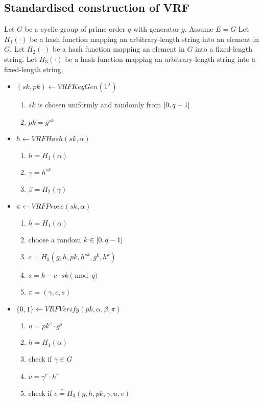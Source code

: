 \subsection{Standardised construction of VRF}

Let $G$ be a cyclic group of prime order $q$ with generator $g$. Assume $E = G$
Let $H_1(\cdot)$ be a hash function mapping an arbitrary-length string into an element in $G$.
Let $H_2(\cdot)$ be a hash function mapping an element in $G$ into a fixed-length string.
Let $H_3(\cdot)$ be a hash function mapping an arbitrary-length string into a fixed-length string.

\begin{itemize}
    \item $(sk, pk) \leftarrow VRFKeyGen(1^{\lambda})$
        \begin{enumerate}
            \item $sk$ is chosen uniformly and randomly from $\interval{0}{q-1}$
            \item $pk = g^{sk}$
        \end{enumerate}
    \item $h \leftarrow VRFHash(sk, \alpha)$
        \begin{enumerate}
            \item $h = H_{1}(\alpha)$
            \item $\gamma = h^{sk}$
            \item $\beta = H_{2}(\gamma)$
        \end{enumerate}
    \item $\pi \leftarrow VRFProve(sk, \alpha)$
        \begin{enumerate}
            \item $h = H_{1}(\alpha)$
            \item choose a random $k \in \interval{0}{q-1}$
            \item $c = H_{3}(g, h, pk, h^{sk}, g^{k}, h^{k})$
            \item $s = k - c \cdot sk \pmod{q}$
            \item $\pi = (\gamma, c, s)$
        \end{enumerate}
    \item $\{0, 1\} \leftarrow VRFVerify(pk, \alpha, \beta, \pi)$
        \begin{enumerate}
            \item $u = pk^{c} \cdot g^{s}$
            \item $h = H_{1}(\alpha)$
            \item check if $\gamma \in G$
            \item $v = \gamma^{c} \cdot h^{s}$
            \item check if $c \stackrel{?}{=} H_{3}(g, h, pk, \gamma, u, v)$
        \end{enumerate}
\end{itemize}